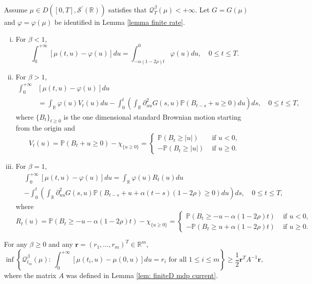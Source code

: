 \documentclass[10pt,a4paper]{amsart}
\newcommand{\R}{\mathbb{R}}
\newcommand{\Scal}{\mathcal{S}}
\begin{document}
\begin{lemma}\label{lemma 5.3}
	Assume $\mu\in D ([0, T], \Scal^\prime(\R))$ satisfies that $\mathcal{Q}_{T}^\beta (\mu)<+\infty$.   Let  $G = G(\mu)$ and $\varphi = \varphi (\mu)$ be identified  in Lemma \ref{lemma finite rate}.
	\begin{enumerate}[(i)]
		\item For $\beta<1$,
		\[
		\int_0^{+\infty}[\mu(t,u)-\varphi (u)]du=\int_{-\alpha(1-2\rho)t}^0 \varphi (u) du, \quad 0\leq t\leq T.
		\]
		\item For $\beta>1$,
		\begin{align*}
			\int_0^{+\infty}&[\mu(t,u)-\varphi (u)]du\\
			&=\int_{\R}\varphi (u) V_t(u)du-\int_0^t\left(\int_{\R}\partial_{uu}^2G (s,u)\mathbb{P}(B_{t-s}+u\geq 0)du\right)ds, \quad 0 \leq t \leq T,
		\end{align*}
		where $\{B_t\}_{t\geq 0}$ is the one dimensional standard Brownian motion starting from the origin and 
		\[
		V_t(u)=\mathbb{P}(B_t+u\geq 0)-\chi_{\{u\geq 0\}}=
		\begin{cases}
			\mathbb{P}(B_t\geq |u|) & \text{~if~}u<0,\\
			-\mathbb{P}(B_t\geq |u|) & \text{~if~}u\geq 0. 
		\end{cases}
		\]
		\item For $\beta=1$,
		\begin{align*}
			&\int_0^{+\infty} [\mu(t,u)-\varphi (u)] du=\int_{\R}\varphi (u)R_t(u)du\\
			&-\int_0^t\left(\int_{\R}\partial_{uu}^2 G (s,u)\mathbb{P}(B_{t-s}+u+\alpha(t-s)(1-2\rho)\geq 0)du\right)ds, \quad 0 \leq t \leq T,
		\end{align*}
		where 
		\[
		R_t(u)=\mathbb{P}(B_t\geq -u-\alpha(1-2\rho)t)-\chi_{\{u\geq 0\}}=
		\begin{cases}
			\mathbb{P}(B_t\geq -u-\alpha(1-2\rho)t) & \text{~if~}u<0,\\
			-\mathbb{P}(B_t\geq u+\alpha(1-2\rho)t) & \text{~if~}u\geq 0. 
		\end{cases}
		\] 
	\end{enumerate}
\end{lemma}

\begin{lemma}\label{lemma contraction principle of current}
For any $\beta\geq 0$ and any $\mathbf{r}=(r_1,\ldots, r_m)^T\in \mathbb{R}^m$, 
\[
\inf\left\{\mathcal{Q}^\beta_{t_m} (\mu):~\int_0^{+\infty} [\mu(t_i,u)-\mu(0, u)] du=r_i\text{~for all~}1\leq i\leq m\right\}\geq \frac{1}{2} \mathbf{r}^T A^{-1} \mathbf{r},
\]
where the matrix $A$ was defined in Lemma \ref{lem: finiteD mdp current}.
\end{lemma}
\end{document}
